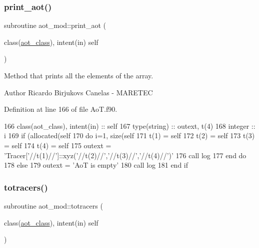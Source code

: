 \subsubsection{\texorpdfstring{print\+\_\+aot()}{print\_aot()}}
{\footnotesize\ttfamily subroutine aot\+\_\+mod\+::print\+\_\+aot (\begin{DoxyParamCaption}\item[{class(\mbox{\hyperlink{structaot__mod_1_1aot__class}{aot\+\_\+class}}), intent(in)}]{self }\end{DoxyParamCaption})\hspace{0.3cm}{\ttfamily [private]}}



Method that prints all the elements of the array. 

\begin{DoxyAuthor}{Author}
Ricardo Birjukovs Canelas -\/ M\+A\+R\+E\+T\+EC 
\end{DoxyAuthor}


Definition at line 166 of file Ao\+T.\+f90.


\begin{DoxyCode}
166     \textcolor{keywordtype}{class}(aot\_class), \textcolor{keywordtype}{intent(in)} :: self
167     \textcolor{keywordtype}{type}(string) :: outext, t(4)
168     \textcolor{keywordtype}{integer} :: i
169     \textcolor{keywordflow}{if} (\textcolor{keyword}{allocated}(self%
170         \textcolor{keywordflow}{do} i=1, \textcolor{keyword}{size}(self%
171             t(1) = self%
172             t(2) = self%
173             t(3) = self%
174             t(4) = self%
175             outext = \textcolor{stringliteral}{'Tracer['}//t(1)//\textcolor{stringliteral}{']::xyz('}//t(2)//\textcolor{stringliteral}{','}//t(3)//\textcolor{stringliteral}{','}//t(4)//\textcolor{stringliteral}{')'}
176             \textcolor{keyword}{call }log%
177 \textcolor{keywordflow}{        end do}
178     \textcolor{keywordflow}{else}
179         outext = \textcolor{stringliteral}{'AoT is empty'}
180         \textcolor{keyword}{call }log%
181 \textcolor{keywordflow}{    end if}
\end{DoxyCode}
\mbox{\label{namespaceaot__mod_a73ecd8babd54975720741493be733c48}} 
\subsubsection{\texorpdfstring{totracers()}{totracers()}}
{\footnotesize\ttfamily subroutine aot\+\_\+mod\+::totracers (\begin{DoxyParamCaption}\item[{class(\mbox{\hyperlink{structaot__mod_1_1aot__class}{aot\+\_\+class}}), intent(in)}]{self }\end{DoxyParamCaption})\hspace{0.3cm}{\ttfamily [private]}}



